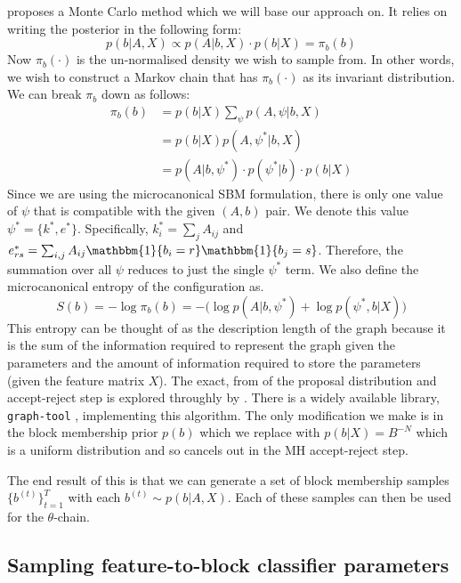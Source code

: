 \documentclass{article}
\newcommand{\one}{\mathbbm{1}}
\begin{document}
\citet{Peixoto-MCMC} proposes a Monte Carlo method which we will base our approach on. It relies on writing the posterior in the following form:
%
\begin{equation}
	p(b | A, X) \propto p(A | b, X) \cdot p(b | X) = \pi_b(b)
\end{equation}
%
Now $\pi_b(\cdot)$ is the un-normalised density we wish to sample from. In other words, we wish to construct a Markov chain that has $\pi_b(\cdot)$ as its invariant distribution. We can break $\pi_b$ down as follows:
%
\begin{align*}
	\pi_b(b) &= p(b|X) \sum_{\psi} \nolimits p(A , \psi | b, X) \\
	&= p(b|X) p(A, \psi^* | b, X) \\
	&= p(A | b, \psi^*) \cdot p(\psi^* | b) \cdot p(b | X)
\end{align*}
%
Since we are using the microcanonical SBM formulation, there is only one value of $\psi$ that is compatible with the given $(A, b)$ pair. We denote this value $\psi^* = \{k^*, e^*\}$. Specifically, $k^*_i = \sum_j A_{ij} $ and $e^*_{rs} = \sum_{i, j} A_{ij} \one \{b_i=r\} \one\{b_j=s\}$. Therefore, the summation over all $\psi$ reduces to just the single $\psi^*$ term. We also define the microcanonical entropy of the configuration as.
%
\begin{equation}
	S(b) = - \log \pi_b(b) = - \Big( \log p(A | b, \psi^*) + \log p(\psi^*, b | X) \Big)
\end{equation}
%
This entropy can be thought of as the description length of the graph because it is the sum of the information required to represent the graph given the parameters and the amount of information required to store the parameters (given the feature matrix $X$). The exact, from of the proposal distribution and accept-reject step is explored throughly by \citet{Peixoto-MCMC}. There is a widely available library, \verb*|graph-tool| \cite{peixoto_graph-tool_2014}, implementing this algorithm. The only modification we make is in the block membership prior $p(b)$ which we replace with $p(b|X)=B^{-N}$ which is a uniform distribution and so cancels out in the MH accept-reject step.

The end result of this is that we can generate a set of block membership samples $\{b^{(t)}\}_{t=1}^{T}$ with each $b^{(t)} \sim p(b | A, X)$. Each of these samples can then be used for the $\theta$-chain.

\subsection{Sampling feature-to-block classifier parameters}
\end{document}
